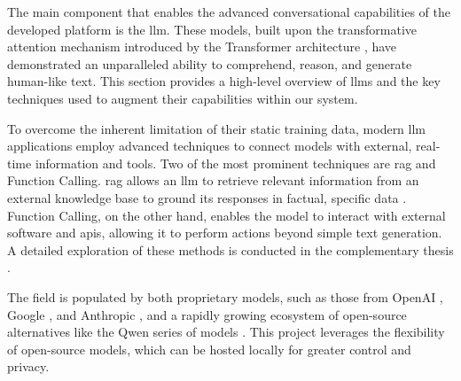 The main component that enables the advanced conversational capabilities of the developed platform is the \acl{llm}. These models, built upon the transformative attention mechanism introduced by the Transformer architecture \cite{SOTA-TRANSFORMERS}, have demonstrated an unparalleled ability to comprehend, reason, and generate human-like text. This section provides a high-level overview of \acp{llm} and the key techniques used to augment their capabilities within our system.

To overcome the inherent limitation of their static training data, modern \ac{llm} applications employ advanced techniques to connect models with external, real-time information and tools. Two of the most prominent techniques are \ac{rag} and Function Calling. \ac{rag} allows an \ac{llm} to retrieve relevant information from an external knowledge base to ground its responses in factual, specific data \cite{SOTA-RAG-SURVEY}. Function Calling, on the other hand, enables the model to interact with external software and \acp{api}, allowing it to perform actions beyond simple text generation. A detailed exploration of these methods is conducted in the complementary thesis \cite{MUI2ICSI_THESIS}.

The field is populated by both proprietary models, such as those from OpenAI \cite{CHATGPT}, Google \cite{GEMINI}, and Anthropic \cite{CLAUDE}, and a rapidly growing ecosystem of open-source alternatives like the Qwen series of models \cite{QWEN}. This project leverages the flexibility of open-source models, which can be hosted locally for greater control and privacy.